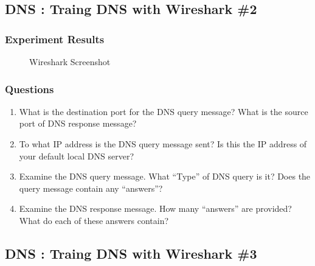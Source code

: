 \subsection{DNS : Traing DNS with Wireshark \#2}
    \subsubsection*{Experiment Results}
         \vspace{-4mm}
    	\begin{figure}[!h]\centering
    		\caption{Wireshark Screenshot}
    	\end{figure}
        \vspace{-4mm}  
    \subsubsection*{Questions}
        \begin{enumerate}[label=\bfseries Problem \arabic*:,leftmargin=*,labelindent=1em]
        \addtocounter{enumi}{7}
            \item What is the destination port for the DNS query message? 
            What is the source port of DNS response message?\\[0.2mm]
            \soln
            
            \item To what IP address is the DNS query message sent? 
            Is this the IP address of your default local DNS server?\\[0.2mm]
            \soln
            
            \item Examine the DNS query message. What “Type” of DNS query is it? 
            Does the query message contain any “answers”?\\[0.2mm]
            \soln
            
            \item Examine the DNS response message. 
            How many “answers” are provided? What do each of these answers contain?\\[0.2mm]
            \soln
            
        \end{enumerate}
\subsection{DNS : Traing DNS with Wireshark \#3}
